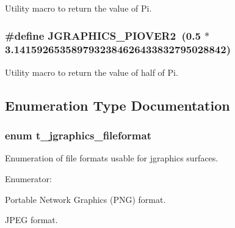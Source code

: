 Utility macro to return the value of Pi. \hypertarget{group__jgraphics_gad1ac187e1ba64c0b956d6fff6a3da8dc}{
\subsubsection[{JGRAPHICS\_\-PIOVER2}]{\setlength{\rightskip}{0pt plus 5cm}\#define JGRAPHICS\_\-PIOVER2~(0.5 $\ast$ 3.1415926535897932384626433832795028842)}}
\label{group__jgraphics_gad1ac187e1ba64c0b956d6fff6a3da8dc}


Utility macro to return the value of half of Pi. 

\subsection{Enumeration Type Documentation}
\hypertarget{group__jgraphics_ga81465e1a6989399e343d081defd90dbe}{
\subsubsection[{t\_\-jgraphics\_\-fileformat}]{\setlength{\rightskip}{0pt plus 5cm}enum {\bf t\_\-jgraphics\_\-fileformat}}}
\label{group__jgraphics_ga81465e1a6989399e343d081defd90dbe}


Enumeration of file formats usable for jgraphics surfaces. \begin{Desc}
\item[Enumerator: ]\par
\begin{description}
\item[{\em 
\hypertarget{group__jgraphics_gga81465e1a6989399e343d081defd90dbea2370a1696e7b478145fece2d7b2ee903}{
JGRAPHICS\_\-FILEFORMAT\_\-PNG}
\label{group__jgraphics_gga81465e1a6989399e343d081defd90dbea2370a1696e7b478145fece2d7b2ee903}
}]Portable Network Graphics (PNG) format. \item[{\em 
\hypertarget{group__jgraphics_gga81465e1a6989399e343d081defd90dbeae2a7397922debc6f37505eb58aa58d2f}{
JGRAPHICS\_\-FILEFORMAT\_\-JPEG}
\label{group__jgraphics_gga81465e1a6989399e343d081defd90dbeae2a7397922debc6f37505eb58aa58d2f}
}]JPEG format. \end{description}
\end{Desc}

